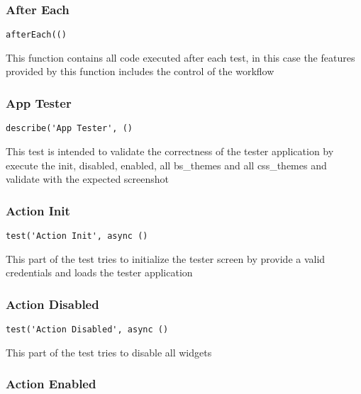 \documentclass[a4paper]{article}
\begin{document}
\hypertarget{toc267}{}
\subsubsection{After Each}

\begin{lstlisting}
afterEach(()
\end{lstlisting}

This function contains all code executed after each test, in this case the
features provided by this function includes the control of the workflow

\hypertarget{toc268}{}
\subsubsection{App Tester}

\begin{lstlisting}
describe('App Tester', ()
\end{lstlisting}

This test is intended to validate the correctness of the tester application
by execute the init, disabled, enabled, all bs\_themes and all css\_themes and
validate with the expected screenshot

\hypertarget{toc269}{}
\subsubsection{Action Init}

\begin{lstlisting}
test('Action Init', async ()
\end{lstlisting}

This part of the test tries to initialize the tester screen by provide a
valid credentials and loads the tester application

\hypertarget{toc270}{}
\subsubsection{Action Disabled}

\begin{lstlisting}
test('Action Disabled', async ()
\end{lstlisting}

This part of the test tries to disable all widgets

\hypertarget{toc271}{}
\subsubsection{Action Enabled}
\end{document}
